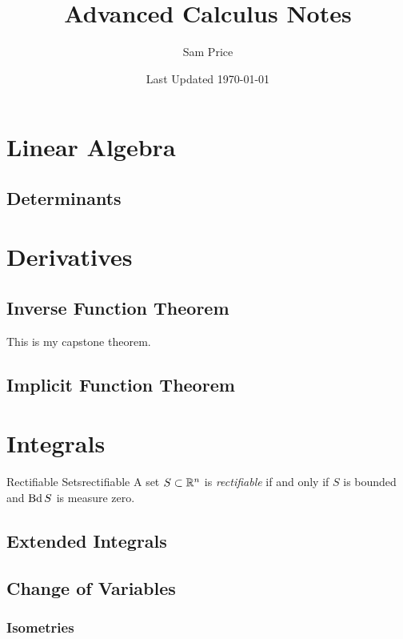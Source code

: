 \documentclass{article}
\author{Sam Price}
\date{Last Updated \today}
\title{Advanced Calculus Notes}
\begin{document}
\maketitle

\section{Linear Algebra}

\subsection{Determinants}

\section{Derivatives}

\subsection{Inverse Function Theorem}

This is my capstone theorem.

\subsection{Implicit Function Theorem}

\section{Integrals}

\begin{definition}{Rectifiable Sets}{rectifiable}
  A set $S \subset \RR[n]$ is \emph{rectifiable} if and only if
  $S$ is bounded and $\Bd S$ is measure zero.
\end{definition}


\subsection{Extended Integrals}

\subsection{Change of Variables}

\subsubsection{Isometries}
\end{document}
